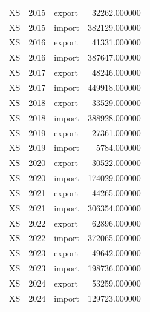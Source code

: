 \begin{tabular}{lrlr}
XS & 2015 & export & 32262.000000 \\
XS & 2015 & import & 382129.000000 \\
XS & 2016 & export & 41331.000000 \\
XS & 2016 & import & 387647.000000 \\
XS & 2017 & export & 48246.000000 \\
XS & 2017 & import & 449918.000000 \\
XS & 2018 & export & 33529.000000 \\
XS & 2018 & import & 388928.000000 \\
XS & 2019 & export & 27361.000000 \\
XS & 2019 & import & 5784.000000 \\
XS & 2020 & export & 30522.000000 \\
XS & 2020 & import & 174029.000000 \\
XS & 2021 & export & 44265.000000 \\
XS & 2021 & import & 306354.000000 \\
XS & 2022 & export & 62896.000000 \\
XS & 2022 & import & 372065.000000 \\
XS & 2023 & export & 49642.000000 \\
XS & 2023 & import & 198736.000000 \\
XS & 2024 & export & 53259.000000 \\
XS & 2024 & import & 129723.000000 \\
\bottomrule
\end{tabular}
